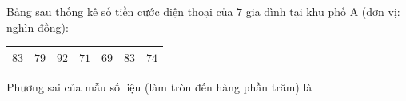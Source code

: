 \begin{ex}
Bảng sau thống kê số tiền cước điện thoại của $7$ gia đình tại khu phố A (đơn vị: nghìn đồng):
\begin{center}
\begin{tabular}{|c|c|c|c|c|c|c|}\hline
$83$ & $79$ & $92$ & $71$ & $69$ & $83$ & $74$\\\hline
\end{tabular}
\end{center}
Phương sai của mẫu số liệu (làm tròn đến hàng phần trăm) là
\end{ex}
